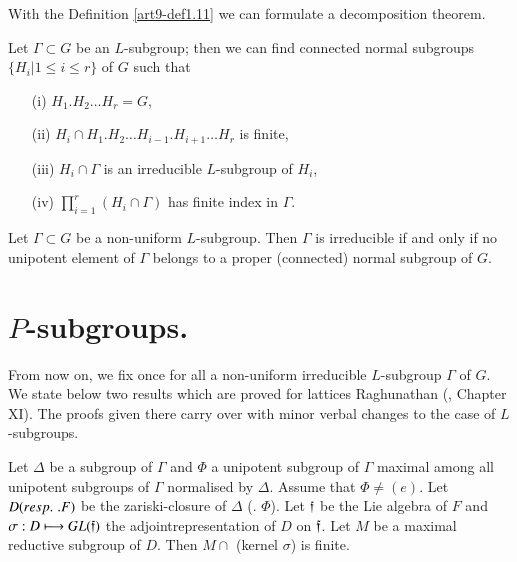 With the Definition \ref{art9-def1.11} we can formulate a decomposition theorem.

\begin{coro}\label{art9-coro1.13}
Let $\Gamma \subset G$ be an $L$-subgroup; then we can find connected normal subgroups $\{H_i \big| 1 \leqslant i \leqslant r\}$ of $G$ such that 
\begin{itemize}
\item[(i)] $H_1 . H_2 \ldots H_r = G$,

\item[(ii)] $H_i \cap H_1 . H_2 \ldots H_{i-1}. H_{i+1} \ldots H_r$ is finite,

\item[(iii)] $H_i \cap \Gamma$ is an irreducible $L$-subgroup of $H_i$,

\item[(iv)] $\prod\limits^{r}_{i=1} (H_i \cap \Gamma)$ has finite index in $\Gamma$. 
\end{itemize}
\end{coro}

\begin{coro}\label{art9-coro1.14}
Let $\Gamma \subset G$ be a non-uniform $L$-subgroup. Then $\Gamma$ is irreducible if and only if no unipotent element of $\Gamma$ belongs to a proper (connected) normal subgroup of $G$.
\end{coro}

\section{$P$-subgroups.}\label{art9-sec2}
From now on, we fix once for all a non-uniform irreducible $L$-subgroup $\Gamma$ of $G$. We state below two results which are proved for lattices Raghunathan (\cite{art9-key1}, Chapter XI). The proofs given there carry over with minor verbal changes to the case of $L$-subgroups.


\begin{theorem}\label{art9-thm2.1}
Let $\Delta$ be a subgroup of $\Gamma$ and $\Phi$ a unipotent subgroup of $\Gamma$ maximal among all unipotent subgroups of $\Gamma$ normalised by $\Delta$. Assume that $\Phi \neq (e)$. Let $D({resp.}\kern.3em. F)$ be the zariski-closure of $\Delta$ (\resp. $\Phi$). Let $\mathfrak{f}$ be the Lie algebra of $F$ and $\sigma : D \longmapsto G L(\mathfrak{f})$ the adjoint\pageoriginale representation of $D$ on $\mathfrak{f}$. Let $M$ be a maximal reductive subgroup of $D$. Then $M \cap$ (kernel $\sigma$) is finite.
\end{theorem}

